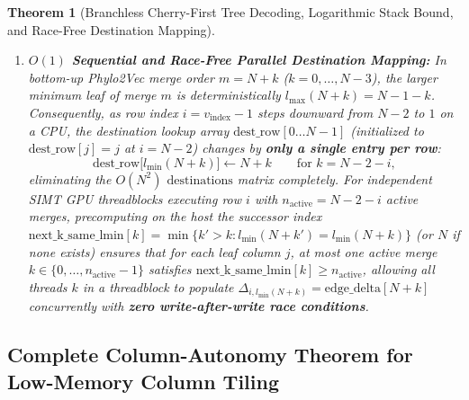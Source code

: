 \documentclass[11pt,a4paper]{article}
\newtheorem{theorem}{Theorem}[section]
\theoremstyle{definition}
\begin{document}
\begin{theorem}[Branchless Cherry-First Tree Decoding, Logarithmic Stack Bound, and Race-Free Destination Mapping]
\begin{enumerate}
    \item \textbf{$O(1)$ Sequential and Race-Free Parallel Destination Mapping:} In bottom-up Phylo2Vec merge order $m = N + k$ ($k = 0, \dots, N-3$), the larger minimum leaf of merge $m$ is deterministically $l_{\max}(N+k) = N - 1 - k$. Consequently, as row index $i = v_{\text{index}} - 1$ steps downward from $N-2$ to $1$ on a CPU, the destination lookup array $\text{dest\_row}[0 \dots N-1]$ (initialized to $\text{dest\_row}[j] = j$ at $i = N-2$) changes by \textbf{only a single entry per row}:
    \begin{equation}
    \text{dest\_row}\big[l_{\min}(N + k)\big] \leftarrow N + k \qquad \text{for } k = N - 2 - i,
    \end{equation}
    eliminating the $O(N^2)$ $\text{destinations}$ matrix completely. For independent SIMT GPU threadblocks executing row $i$ with $n_{\text{active}} = N - 2 - i$ active merges, precomputing on the host the successor index $\text{next\_k\_same\_lmin}[k] = \min\{k' > k : l_{\min}(N+k') = l_{\min}(N+k)\}$ (or $N$ if none exists) ensures that for each leaf column $j$, at most one active merge $k \in \{0, \dots, n_{\text{active}}-1\}$ satisfies $\text{next\_k\_same\_lmin}[k] \ge n_{\text{active}}$, allowing all threads $k$ in a threadblock to populate $\Delta_{i, l_{\min}(N+k)} = \text{edge\_delta}[N+k]$ concurrently with \textbf{zero write-after-write race conditions}.
\end{enumerate}
\end{theorem}

\subsection{Complete Column-Autonomy Theorem for Low-Memory Column Tiling}
\end{document}
